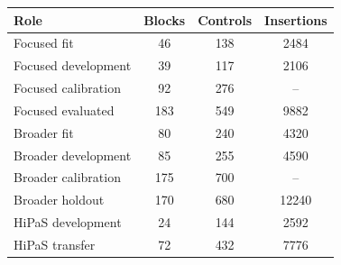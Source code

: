 \setlength{\tabcolsep}{4pt}\footnotesize
\begin{tabular}{@{}l S[table-format=3.0] S[table-format=3.0] S[table-format=5.0,group-digits=integer,group-minimum-digits=4,group-separator={,}]@{}}
\toprule
Role & {Blocks} & {Controls} & {Insertions} \\
\midrule
Focused fit & 46 & 138 & 2484 \\
Focused development & 39 & 117 & 2106 \\
Focused calibration & 92 & 276 & {--} \\
Focused evaluated & 183 & 549 & 9882 \\
\midrule
Broader fit & 80 & 240 & 4320 \\
Broader development & 85 & 255 & 4590 \\
Broader calibration & 175 & 700 & {--} \\
Broader holdout & 170 & 680 & 12240 \\
\midrule
HiPaS development & 24 & 144 & 2592 \\
HiPaS transfer & 72 & 432 & 7776 \\
\bottomrule
\end{tabular}
